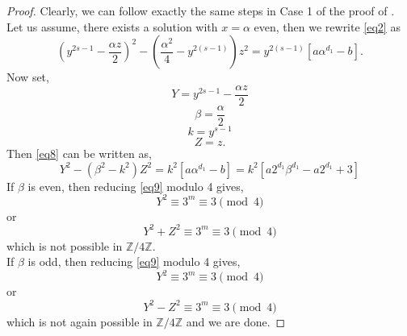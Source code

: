 \documentclass[10pt,a4paper]{amsart}
\begin{document}
\begin{proof}
    Clearly, we can follow exactly the same steps in Case 1 of the proof of .\\
    Let us assume, there exists a solution with $x= \alpha$ even, then we rewrite \eqref{eq2} as
    \begin{equation}
        \left( y^{2s-1}-\frac{\alpha z}{2}\right)^2-\left( \frac{\alpha ^2}{4}-y^{2(s-1)}\right)z^2=y^{2(s-1)}[ a\alpha ^{d_1}-b].  \label{eq8}
    \end{equation}
    Now set,
    \begin{equation*}
    Y= y^{2s-1}-\frac{\alpha z}{2}
    \end{equation*}
    \begin{equation*}
        \beta= \frac{\alpha}{2}
    \end{equation*}
    \begin{equation*}
        k=y^{s-1}
    \end{equation*}
    \begin{equation*}
        Z=z.
    \end{equation*}
    Then \eqref{eq8} can be written as,
    \begin{equation}
    Y^2-\left(\beta ^2-k^2\right )Z^2=k^2\left[ a\alpha ^{d_1}-b\right] = k^2\left[a2^{d_1}\beta ^{d_1}-a2^{d_1}+3\right] \label{eq9}
    \end{equation}
    If $\beta$ is even, then reducing \eqref{eq9} modulo 4 gives,
    \begin{equation*}
        Y^2 \equiv 3^m \equiv 3 \pmod{4} 
    \end{equation*} or 
    \begin{equation}
        Y^2+Z^2 \equiv 3^m \equiv 3 \pmod{4}
    \end{equation}
    which is not possible in $\mathbb{Z}/{4\mathbb{Z}}$.\\
    If $\beta$ is odd, then reducing \eqref{eq9} modulo 4 gives,
    \[Y^2 \equiv 3^m \equiv 3 \pmod{4}\] or
    \begin{equation}
        Y^2-Z^2 \equiv 3^m \equiv 3 \pmod{4}
    \end{equation}
    which is not again possible in $\mathbb{Z}/{4\mathbb{Z}}$ and we are done.
    \vspace{2mm}
\end{proof}
\end{document}
